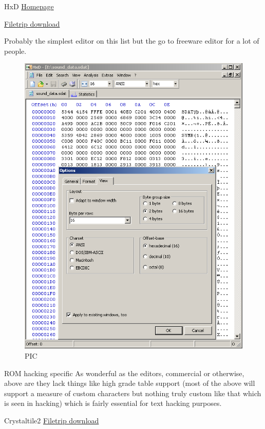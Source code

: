\documentclass[
]{book}
\begin{document}
HxD \href{http://mh-nexus.de/en/hxd/}{Homepage}

\href{http://filetrip.net/pc-downloads/applications/download-hxd-hex-editor-1770-f12907.html}{Filetrip download}

Probably the simplest editor on this list but the go to freeware editor for a lot of people.

\begin{figure}
\centering
\includegraphics{images/6_home_fast6191_romhackingguide_unrenamed_files___rders_romhackingguidehexeditorsshowcaseHxD1.png}
\caption{PIC}
\end{figure}

ROM hacking specific As wonderful as the editors, commercial or otherwise, above are they lack things like high grade table support (most of the above will support a measure of custom characters but nothing truly custom like that which is seen in hacking) which is fairly essential for text hacking purposes.

Crystaltile2 \href{http://filetrip.net/f23649-CrystalTile2-2010-09-06.html}{Filetrip download}
\end{document}
